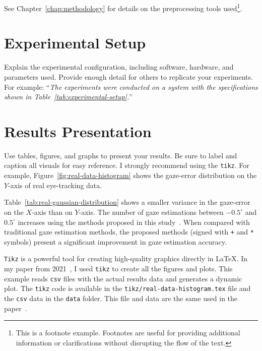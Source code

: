 See Chapter~\ref{chap:methodology} for details on the preprocessing tools used\footnote{This is a footnote example. Footnotes are useful for providing additional information or clarifications without disrupting the flow of the text.}.

\section{Experimental Setup}\label{sec:experimental-setup}
Explain the experimental configuration, including software, hardware, and parameters used. Provide enough detail for others to replicate your experiments. For example: ``\textit{The experiments were conducted on a system with the specifications shown in Table~\ref{tab:experimental-setup}.}''


\section{Results Presentation}\label{sec:results-presentation}
Use tables, figures, and graphs to present your results. Be sure to label and caption all visuals for easy reference. I strongly recommend using the \texttt{tikz}. For example, Figure~\ref{fig:real-data-histogram} shows the gaze-error distribution on the $Y$-axis of real eye-tracking data.
\begin{figure*}[!ht]
    \centering
    \resizebox{\textwidth}{!}{%
        
    }
    \caption{Example of dynamic \texttt{tikz} plot that reads \texttt{csv} files with actual results data.}
    \label{fig:real-data-histogram}
\end{figure*}

Table~\ref{tab:real-gaussian-distribution} shows a smaller variance in the gaze-error on the $X$-axis than on $Y$-axis. The number of gaze estimations between $-0.5^\circ$ and $0.5^\circ$ increases using the methods proposed in this study~\cite{Narcizo2021}. When compared with traditional gaze estimation methods, the proposed methods (signed with \texttt{+} and \texttt{*} symbols) present a significant improvement in gaze estimation accuracy.


\texttt{Tikz} is a powerful tool for creating high-quality graphics directly in \LaTeX. In my paper from 2021~\cite{Narcizo2021}, I used \texttt{tikz} to create all the figures and plots. This example reads \texttt{csv} files with the actual results data and generates a dynamic plot. The \texttt{tikz} code is available in the \texttt{tikz/real-data-histogram.tex} file and the \texttt{csv} data in the \texttt{data} folder. This file and data are the same used in the paper~\cite{Narcizo2021}.

